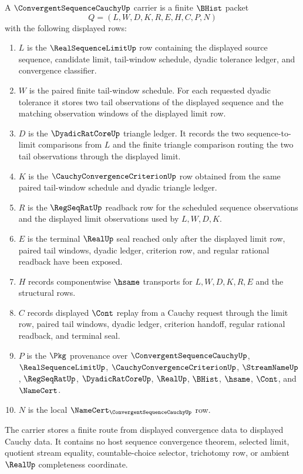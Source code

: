 \begin{definition}\label{def:convergent-sequence-cauchy-carrier}
A $\ConvergentSequenceCauchyUp$ carrier is a finite $\BHist$ packet
$$
Q=(L,W,D,K,R,E,H,C,P,N)
$$
with the following displayed rows:
\begin{enumerate}
\item $L$ is the $\RealSequenceLimitUp$ row containing the displayed source sequence, candidate limit, tail-window schedule, dyadic tolerance ledger, and convergence classifier.
\item $W$ is the paired finite tail-window schedule. For each requested dyadic tolerance it stores two tail observations of the displayed sequence and the matching observation windows of the displayed limit row.
\item $D$ is the $\DyadicRatCoreUp$ triangle ledger. It records the two sequence-to-limit comparisons from $L$ and the finite triangle comparison routing the two tail observations through the displayed limit.
\item $K$ is the $\CauchyConvergenceCriterionUp$ row obtained from the same paired tail-window schedule and dyadic triangle ledger.
\item $R$ is the $\RegSeqRatUp$ readback row for the scheduled sequence observations and the displayed limit observations used by $L,W,D,K$.
\item $E$ is the terminal $\RealUp$ seal reached only after the displayed limit row, paired tail windows, dyadic ledger, criterion row, and regular rational readback have been exposed.
\item $H$ records componentwise $\hsame$ transports for $L,W,D,K,R,E$ and the structural rows.
\item $C$ records displayed $\Cont$ replay from a Cauchy request through the limit row, paired tail windows, dyadic ledger, criterion handoff, regular rational readback, and terminal seal.
\item $P$ is the $\Pkg$ provenance over $\ConvergentSequenceCauchyUp$, $\RealSequenceLimitUp$, $\CauchyConvergenceCriterionUp$, $\StreamNameUp$, $\RegSeqRatUp$, $\DyadicRatCoreUp$, $\RealUp$, $\BHist$, $\hsame$, $\Cont$, and $\NameCert$.
\item $N$ is the local $\NameCert_{\ConvergentSequenceCauchyUp}$ row.
\end{enumerate}
The carrier stores a finite route from displayed convergence data to displayed Cauchy data. It contains no host sequence convergence theorem, selected limit, quotient stream equality, countable-choice selector, trichotomy row, or ambient $\RealUp$ completeness coordinate.
\end{definition}

